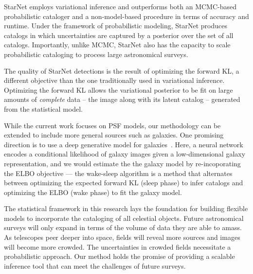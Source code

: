 StarNet employs variational inference and outperforms both an MCMC-based probabilistic cataloger and a non-model-based
procedure in terms of accuracy and runtime.
Under the framework of probabilistic modeling,
StarNet produces catalogs in which uncertainties are captured by a posterior over the set of all catalogs.
Importantly, unlike MCMC, StarNet also has the capacity to scale probabilistic cataloging to process large astronomical surveys.

The quality of StarNet detections is the result of optimizing the forward KL, a different objective than the one traditionally used in variational inference.
Optimizing the forward KL allows the variational posterior to be fit on large amounts of {\itshape complete} data -- the image along with its latent catalog -- generated from the statistical model.

While the current work focuses on PSF models, our methodology can be extended to
include more general sources such as galaxies.
One promising direction is to use a deep generative model for galaxies~\citep{Regier2015ADG, Reiman_2019_gans_deblend, lanusse2020deep, Arcelin_2020}.
Here, a neural network encodes a conditional likelihood of galaxy images given a low-dimensional galaxy representation,
and we would estimate the the galaxy model by re-incoporating the ELBO objective ---
the wake-sleep algorithm is a method that alternates between optimizing
the expected forward KL (sleep phase) to
infer catalogs and optimizing the ELBO (wake phase) to fit the galaxy model.

The statistical framework in this research lays the foundation for building flexible models to incorporate the cataloging of all celestial objects.
Future astronomical surveys will only expand in terms of the volume of data they are able to amass.
As telescopes peer deeper into space, fields will reveal more sources and images will become more crowded.
The uncertainties in crowded fields necessitate a probabilistic approach.
Our method holds the promise of providing  a scalable inference tool that can meet the challenges of future surveys.
